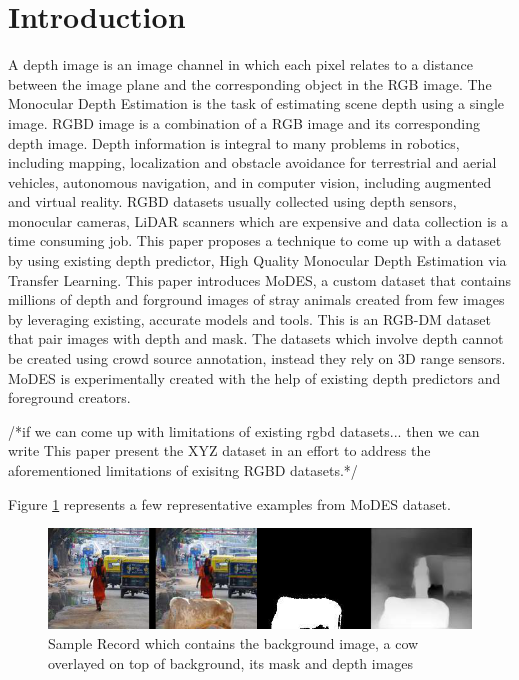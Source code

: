 \documentclass{article}
\begin{document}
\section{Introduction}
A depth image is an image channel in which each pixel relates to a distance between the image plane and the corresponding object in the RGB image. The Monocular Depth Estimation is the task of estimating scene depth using a single image\cite{abuolaim2020defocus}. RGBD image is a combination of a RGB image and its corresponding depth image\cite{zhang2018deep}. Depth information is integral to many problems in
robotics, including mapping, localization and obstacle avoidance for terrestrial and aerial vehicles, autonomous navigation, and in computer vision, including augmented and virtual reality\cite{marchand2015pose}. RGBD datasets usually collected using depth sensors, monocular cameras, LiDAR scanners which are expensive and data collection is a time consuming job. This paper proposes a technique to come up with a dataset by using existing depth predictor, High Quality Monocular Depth Estimation via Transfer Learning. This paper introduces MoDES, a custom dataset that contains millions of depth and forground images of stray animals created from few images by leveraging existing, accurate models and tools. This is an RGB-DM dataset that pair images with depth and mask. The datasets which involve depth cannot be created using crowd source annotation, instead they rely on 3D range sensors. MoDES is experimentally created with the help of existing depth predictors and foreground creators.

/*if we can come up with limitations of existing rgbd datasets... then we can write This paper present the XYZ dataset in an effort to address the aforementioned limitations of exisitng RGBD datasets.*/

Figure \ref{fig:sampledatarecord} represents a few representative examples from MoDES dataset.

\begin{figure}[h!]
\centering
  \includegraphics[width=1\textwidth]{samplerecord.png}
  \caption{Sample Record which contains the background image, a cow overlayed on top of background, its mask and depth images}
  \label{fig:sampledatarecord}
\end{figure}
\end{document}
